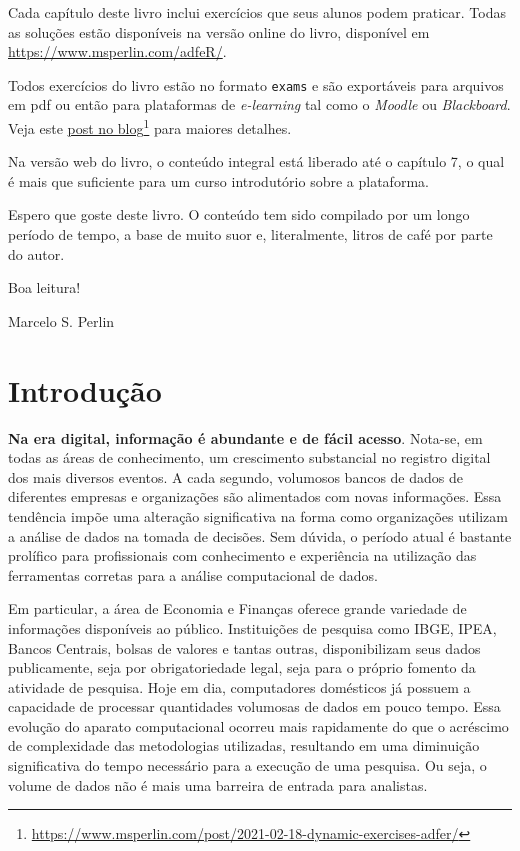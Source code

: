 \documentclass[
  11pt,
]{book}
\providecommand{\tightlist}{%
  \setlength{\itemsep}{0pt}\setlength{\parskip}{0pt}}
\begin{document}
\begin{description}
\tightlist
\item[Exercícios estáticos na internet]
Cada capítulo deste livro inclui exercícios que seus alunos podem praticar. Todas as soluções estão disponíveis na versão online do livro, disponível em \url{https://www.msperlin.com/adfeR/}.
\item[Exercícios exportáveis para pdf ou plataformas de \emph{e-learning}]
Todos exercícios do livro estão no formato \texttt{exams} \citep{R-exams} e são exportáveis para arquivos em pdf ou então para plataformas de \emph{e-learning} tal como o \emph{Moodle} ou \emph{Blackboard}. Veja este \href{https://www.msperlin.com/post/2021-02-18-dynamic-exercises-adfer/}{post no blog}\footnote{\url{https://www.msperlin.com/post/2021-02-18-dynamic-exercises-adfer/}} para maiores detalhes.
\item[Acesso ao livro na internet]
Na versão web do livro, o conteúdo integral está liberado até o capítulo 7, o qual é mais que suficiente para um curso introdutório sobre a plataforma.
\end{description}

Espero que goste deste livro. O conteúdo tem sido compilado por um longo período de tempo, a base de muito suor e, literalmente, litros de café por parte do autor.

Boa leitura!

Marcelo S. Perlin

\hypertarget{introducao}{%
\chapter{Introdução}\label{introducao}}

\textbf{Na era digital, informação é abundante e de fácil acesso}. Nota-se, em todas as áreas de conhecimento, um crescimento substancial no registro digital dos mais diversos eventos. A cada segundo, volumosos bancos de dados de diferentes empresas e organizações são alimentados com novas informações. Essa tendência impõe uma alteração significativa na forma como organizações utilizam a análise de dados na tomada de decisões. Sem dúvida, o período atual é bastante prolífico para profissionais com conhecimento e experiência na utilização das ferramentas corretas para a análise computacional de dados.

Em particular, a área de Economia e Finanças oferece grande variedade de informações disponíveis ao público. Instituições de pesquisa como IBGE, IPEA, Bancos Centrais, bolsas de valores e tantas outras, disponibilizam seus dados publicamente, seja por obrigatoriedade legal, seja para o próprio fomento da atividade de pesquisa. Hoje em dia, computadores domésticos já possuem a capacidade de processar quantidades volumosas de dados em pouco tempo. Essa evolução do aparato computacional ocorreu mais rapidamente do que o acréscimo de complexidade das metodologias utilizadas, resultando em uma diminuição significativa do tempo necessário para a execução de uma pesquisa. Ou seja, o volume de dados não é mais uma barreira de entrada para analistas.
\end{document}
